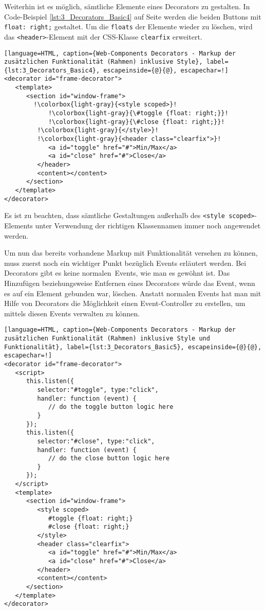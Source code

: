 Weiterhin ist es möglich, sämtliche Elemente eines Decorators zu gestalten. In Code-Beispiel \ref{lst:3_Decorators_Basic4} auf Seite \pageref{lst:3_Decorators_Basic4} werden die beiden Buttons mit \lstinline|float: right;| gestaltet. Um die \lstinline|floats| der Elemente wieder zu löschen, wird das \lstinline|<header>|-Element mit der CSS-Klasse \lstinline|clearfix| erweitert.

\begin{lstlisting}[language=HTML, caption={Web-Components Decorators - Markup der zusätzlichen Funktionalität (Rahmen) inklusive Style}, label={lst:3_Decorators_Basic4}, escapeinside={@}{@}, escapechar=!]
<decorator id="frame-decorator">
   <template>
      <section id="window-frame">
        !\colorbox{light-gray}{<style scoped>}!
            !\colorbox{light-gray}{\#toggle {float: right;}}!
            !\colorbox{light-gray}{\#close {float: right;}}!
         !\colorbox{light-gray}{</style>}!
         !\colorbox{light-gray}{<header class="clearfix">}!
            <a id="toggle" href="#">Min/Max</a>
            <a id="close" href="#">Close</a>
         </header>
         <content></content>
      </section>
   </template>
</decorator>
\end{lstlisting}

Es ist zu beachten, dass sämtliche Gestaltungen außerhalb des \lstinline|<style scoped>|-Elements unter Verwendung der richtigen Klassennamen immer noch angewendet werden.

Um nun das bereits vorhandene Markup mit Funktionalität versehen zu können, muss zuerst noch ein wichtiger Punkt bezüglich Events erläutert werden. Bei Decorators gibt es keine \glqq normalen\grqq\ Events, wie man es gewöhnt ist. Das Hinzufügen beziehungsweise Entfernen eines Decorators würde das Event, wenn es auf ein Element gebunden war, löschen. Anstatt normalen Events hat man mit Hilfe von Decorators die Möglichkeit einen Event-Controller zu erstellen, um mittels diesen Events verwalten zu können.

\begin{lstlisting}[language=HTML, caption={Web-Components Decorators - Markup der zusätzlichen Funktionalität (Rahmen) inklusive Style und Funktionalität}, label={lst:3_Decorators_Basic5}, escapeinside={@}{@}, escapechar=!]
<decorator id="frame-decorator">
   <script>
      this.listen({
         selector:"#toggle", type:"click",
         handler: function (event) {
            // do the toggle button logic here
         }
      });
      this.listen({
         selector:"#close", type:"click",
         handler: function (event) {
            // do the close button logic here
         }
      });
   </script>
   <template>
      <section id="window-frame">
         <style scoped>
            #toggle {float: right;}
            #close {float: right;}
         </style>
         <header class="clearfix">
            <a id="toggle" href="#">Min/Max</a>
            <a id="close" href="#">Close</a>
         </header>
         <content></content>
      </section>
   </template>
</decorator>
\end{lstlisting}


